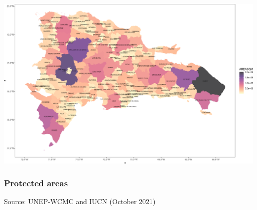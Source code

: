 \documentclass[10pt,landscape,a3paper]{article}
\begin{document}
\begin{center}\includegraphics{img/administrative-2} \end{center}

\hypertarget{protected-areas}{%
\subsubsection{Protected areas}\label{protected-areas}}

Source: UNEP-WCMC and IUCN (October 2021)
\end{document}
